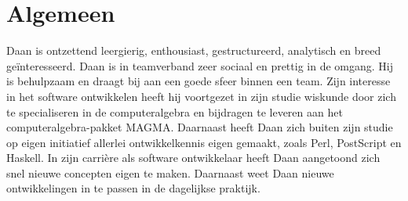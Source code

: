 \section*{Algemeen}

Daan is ontzettend leergierig, enthousiast, gestructureerd, analytisch en breed 
ge\"interesseerd. Daan is in teamverband zeer sociaal en prettig in de omgang. 
Hij is behulpzaam en draagt bij aan een goede sfeer binnen een team. Zijn 
interesse in het software ontwikkelen heeft hij voortgezet in zijn studie 
wiskunde door zich te specialiseren in de computeralgebra en bijdragen te 
leveren aan het computeralgebra-pakket MAGMA. Daarnaast heeft Daan zich buiten 
zijn studie op eigen initiatief allerlei ontwikkelkennis eigen gemaakt, zoals 
Perl, PostScript en Haskell.
In zijn carri\`ere als software ontwikkelaar heeft Daan aangetoond zich snel 
nieuwe concepten eigen te maken. Daarnaast weet Daan nieuwe ontwikkelingen in te
passen in de dagelijkse praktijk.
